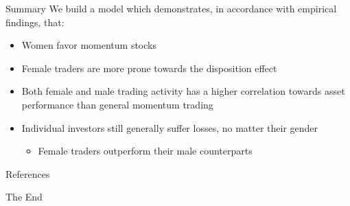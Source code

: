 \documentclass{beamer}
\begin{document}

\begin{frame}{Summary}
We build a model which demonstrates, in accordance with empirical findings, that:
\begin{itemize}
\item Women favor momentum stocks
\item Female traders are more prone towards the disposition effect
\item Both female and male trading activity has a higher correlation towards asset performance than general momentum trading
\item Individual investors still generally suffer losses, no matter their gender
\begin{itemize}
	\item  Female traders outperform their male counterparts 
\end{itemize}
\end{itemize}
\end{frame}



\begin{frame}[allowframebreaks]{References}
	
	
\end{frame}

\begin{frame}
\Huge{\centerline{The End}}
\end{frame}
\end{document}
